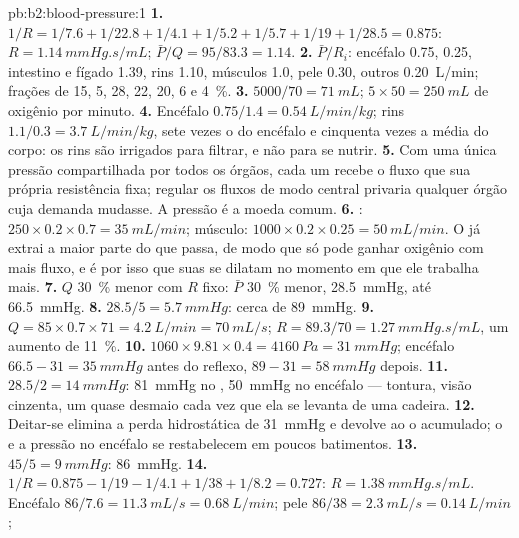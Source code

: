 \begin{solution}{pb:b2:blood-pressure:1}
\textbf{1.} $1/R = 1/7.6 + 1/22.8 + 1/4.1 + 1/5.2 + 1/5.7 + 1/19 +
1/28.5 = 0.875$: $R = \qty{1.14}{mmHg.s/mL}$; $\bar P/Q = 95/83.3 =
1.14$.
\textbf{2.} $\bar P/R_i$: encéfalo 0.75,  0.25, intestino e
fígado 1.39, rins 1.10, músculos 1.0, pele 0.30, outros
\qty{0.20}{L/min}; frações de 15, 5, 28, 22, 20, 6 e \qty{4}{\%}.
\textbf{3.} $5000/70 = \qty{71}{mL}$; $5\times 50 = \qty{250}{mL}$ de
oxigênio por minuto.
\textbf{4.} Encéfalo $0.75/1.4 = \qty{0.54}{L/min/kg}$; rins $1.1/0.3
= \qty{3.7}{L/min/kg}$, sete vezes o do encéfalo e cinquenta vezes a
média do corpo: os rins são irrigados para filtrar, e não para se
nutrir.
\textbf{5.} Com uma única pressão compartilhada por todos os órgãos,
cada um recebe o fluxo que sua própria resistência fixa; regular os
fluxos de modo central privaria qualquer órgão cuja demanda mudasse. A
pressão é a moeda comum.
\textbf{6.} : $250\times 0.2\times 0.7 = \qty{35}{mL/min}$;
músculo: $1000\times 0.2\times 0.25 = \qty{50}{mL/min}$. O  já
extrai a maior parte do que passa, de modo que só pode ganhar oxigênio
com mais fluxo, e é por isso que suas  se dilatam no momento
em que ele trabalha mais.
\textbf{7.} $Q$ \qty{30}{\%} menor com $R$ fixo: $\bar P$ \qty{30}{\%}
menor, \qty{28.5}{mmHg}, até \qty{66.5}{mmHg}.
\textbf{8.} $28.5/5 = \qty{5.7}{mmHg}$: cerca de \qty{89}{mmHg}.
\textbf{9.} $Q = 85\times 0.7\times 71 = \qty{4.2}{L/min} =
\qty{70}{mL/s}$; $R = 89.3/70 = \qty{1.27}{mmHg.s/mL}$, um aumento de
\qty{11}{\%}.
\textbf{10.} $1060\times 9.81\times 0.4 = \qty{4160}{Pa} =
\qty{31}{mmHg}$; encéfalo $66.5 - 31 = \qty{35}{mmHg}$ antes do reflexo,
$89 - 31 = \qty{58}{mmHg}$ depois.
\textbf{11.} $28.5/2 = \qty{14}{mmHg}$: \qty{81}{mmHg} no ,
\qty{50}{mmHg} no encéfalo --- tontura, visão cinzenta, um quase
desmaio cada vez que ela se levanta de uma cadeira.
\textbf{12.} Deitar-se elimina a perda hidrostática de \qty{31}{mmHg}
e devolve ao  o  acumulado; o  e a pressão
no encéfalo se restabelecem em poucos batimentos.
\textbf{13.} $45/5 = \qty{9}{mmHg}$: \qty{86}{mmHg}.
\textbf{14.} $1/R = 0.875 - 1/19 - 1/4.1 + 1/38 + 1/8.2 = 0.727$: $R =
\qty{1.38}{mmHg.s/mL}$. Encéfalo $86/7.6 = \qty{11.3}{mL/s} =
\qty{0.68}{L/min}$; pele $86/38 = \qty{2.3}{mL/s} = \qty{0.14}{L/min}$;

\end{solution}
